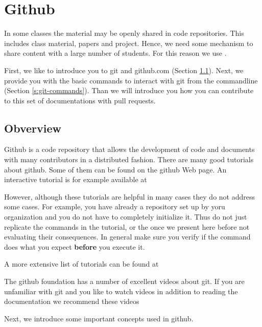 
\chapter{Github}
\label{C:github}

\FILENAME

In some classes the material may be openly shared in code
repositories. This includes class material, papers and project.
Hence, we need some mechanism to share content with a large number of
students. For this reason we use .

First, we like to introduce you to git and github.com (Section
\ref{s:github}).  Next, we provide you with the basic commands to
interact with git from the commandline (Section
\ref{s:git-commands}). Than we will introduce you how you can
contribute to this set of documentations with pull requests.

\section{Obverview}\label{s:github}

Github is a code repository that allows the development of code and
documents with many contributors in a distributed fashion. There are
many good tutorials about github.  Some of them can be found on the
github Web page. An interactive tutorial is for example available at


However, although these tutorials are helpful in many cases they do
not address some cases. For example, you have already a repository set
up by yoru organization and you do not have to completely initialize
it. Thus do not just replicate the commands in the tutorial, or the
once we present here before not evaluating their consequences. In
general make sure you verify if the command does what you expect {\bf
  before} you execute it.

A more extensive list of tutorials can be found at


The github foundation has a number of excellent videos about git. If you
are unfamiliar with git and you like to watch videos in addition to
reading the documentation we recommend these videos


Next, we introduce some important concepts used in github.

